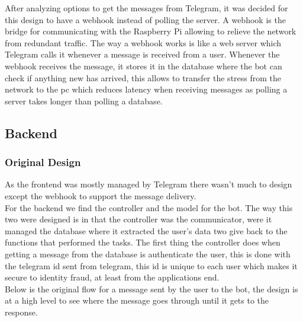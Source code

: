 After analyzing options to get the messages from Telegram, it was decided for this design to have a webhook instead of polling the server. A webhook is the bridge for communicating with the Raspberry Pi allowing to relieve the network from redundant traffic. The way a webhook works is like a web server which Telegram calls it whenever a message is received from a user. Whenever the webhook receives the message, it stores it in the database where the bot can check if anything new has arrived, this allows to transfer the stress from the network to the pc which reduces latency when receiving messages as polling a server takes longer than polling a database.

\subsection{Backend}\label{sec:chap4_ori_des_back}
\subsubsection{Original Design}\label{sec:chap4_ori_des_back}
As the frontend was mostly managed by Telegram there wasn’t much to design except the webhook to support the message delivery.\\

For the backend we find the controller and the model for the bot. The way this two were designed is in that the controller was the communicator, were it managed the database where it extracted the user’s data two give back to the functions that performed the tasks. The first thing the controller does when getting a message from the database is authenticate the user, this is done with the telegram id sent from telegram, this id is unique to each user which makes it secure to identity fraud, at least from the applications end.\\
 
Below is the original flow for a message sent by the user to the bot, the design is at a high level to see where the message goes through until it gets to the response.

